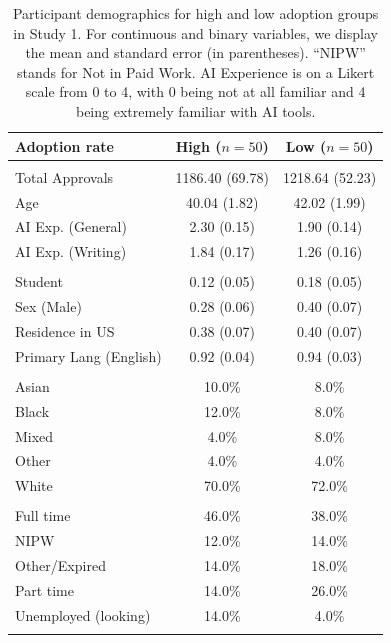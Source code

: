 \begin{table}[ht]
\centering
\small
\begin{tabular}{lcc}
\toprule
Adoption rate & High ($n = 50$) & Low ($n=50$) \\
\midrule
\rowcolor{lightgray}\multicolumn{3}{l}{\textit{Continuous variables}} \\
Total Approvals & 1186.40 (69.78) & 1218.64 (52.23) \\
Age & 40.04 (1.82) & 42.02 (1.99) \\
AI Exp. (General) & 2.30 (0.15) & 1.90 (0.14) \\
AI Exp. (Writing) & 1.84 (0.17) & 1.26 (0.16) \\
\addlinespace
\rowcolor{lightgray}\multicolumn{3}{l}{\textit{Binary variables}} \\
Student & 0.12 (0.05) & 0.18 (0.05) \\
Sex (Male) & 0.28 (0.06) & 0.40 (0.07) \\
Residence in US & 0.38 (0.07) & 0.40 (0.07) \\
Primary Lang (English) & 0.92 (0.04) & 0.94 (0.03) \\
\addlinespace
\rowcolor{lightgray}\multicolumn{3}{l}{\textit{Ethnicity}} \\
\quad Asian & 10.0\% & 8.0\% \\
\quad Black & 12.0\% & 8.0\% \\
\quad Mixed & 4.0\% & 8.0\% \\
\quad Other & 4.0\% & 4.0\% \\
\quad White & 70.0\% & 72.0\% \\
\addlinespace
\rowcolor{lightgray}\multicolumn{3}{l}{\textit{Employment status}} \\
\quad Full time & 46.0\% & 38.0\% \\
\quad NIPW & 12.0\% & 14.0\% \\
\quad Other/Expired & 14.0\% & 18.0\% \\
\quad Part time & 14.0\% & 26.0\% \\
\quad Unemployed (looking) & 14.0\% & 4.0\% \\
\addlinespace
\bottomrule
\end{tabular}
\caption{Participant demographics for high and low adoption groups in Study 1. For continuous and binary variables, we display the mean and standard error (in parentheses). ``NIPW'' stands for Not in Paid Work. AI Experience is on a Likert scale from 0 to 4, with 0 being not at all familiar and 4 being extremely familiar with AI tools.}
\label{tab:summary_2col_study1}
\end{table}
